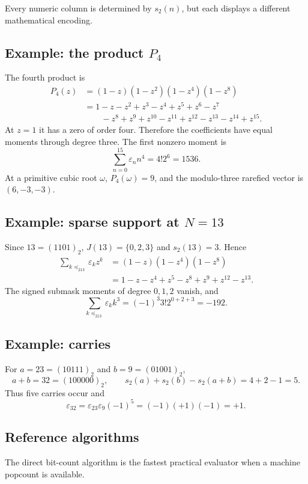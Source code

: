 \documentclass[11pt,oneside]{article}
\theoremstyle{definition}
\theoremstyle{remark}
\newcommand{\bitsum}{s_2}
\newcommand{\eps}{\varepsilon}
\newcommand{\submask}{\preccurlyeq_2}
\begin{document}
Every numeric column is determined by $\bitsum(n)$, but each displays a
different mathematical encoding.

\subsection{Example: the product \texorpdfstring{$P_4$}{P4}}

The fourth product is
\begin{align*}
 P_4(z)
 &=(1-z)(1-z^2)(1-z^4)(1-z^8)\\
 &=1-z-z^2+z^3-z^4+z^5+z^6-z^7\\
 &\qquad-z^8+z^9+z^{10}-z^{11}+z^{12}-z^{13}-z^{14}+z^{15}.
\end{align*}
At $z=1$ it has a zero of order four.  Therefore the coefficients have equal
moments through degree three.  The first nonzero moment is
\[
 \sum_{n=0}^{15}\eps_nn^4=4!2^6=1536.
\]
At a primitive cubic root $\omega$,
$P_4(\omega)=9$, and the modulo-three rarefied vector is
$(6,-3,-3)$.

\subsection{Example: sparse support at \texorpdfstring{$N=13$}{N=13}}

Since $13=(1101)_2$, $J(13)=\{0,2,3\}$ and $\bitsum(13)=3$.  Hence
\begin{align*}
 \sum_{k\submask13}\eps_kz^k
 &=(1-z)(1-z^4)(1-z^8)\\
 &=1-z-z^4+z^5-z^8+z^9+z^{12}-z^{13}.
\end{align*}
The signed submask moments of degree $0,1,2$ vanish, and
\[
 \sum_{k\submask13}\eps_kk^3
 =(-1)^3 3!2^{0+2+3}=-192.
\]

\subsection{Example: carries}

For $a=23=(10111)_2$ and $b=9=(01001)_2$,
\[
 a+b=32=(100000)_2,
 \qquad
 \bitsum(a)+\bitsum(b)-\bitsum(a+b)=4+2-1=5.
\]
Thus five carries occur and
\[
 \eps_{32}=\eps_{23}\eps_9(-1)^5=(-1)(+1)(-1)=+1.
\]

\subsection{Reference algorithms}

The direct bit-count algorithm is the fastest practical evaluator when a
machine popcount is available.
\end{document}
